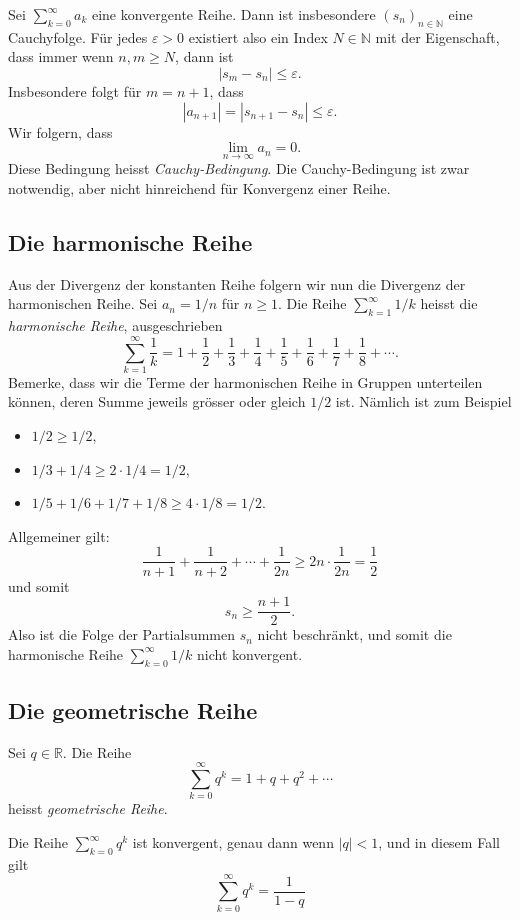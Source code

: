 \documentclass[../main.tex]{subfiles}
\begin{document}
\begin{remark}
  Sei $\sum_{k=0}^{\infty} a_k$ eine konvergente Reihe.
  Dann ist insbesondere ${(s_{n})}_{n \in \mathbb{N}}$ 
  eine Cauchyfolge.
  Für jedes $\varepsilon > 0$ existiert also ein Index
  $N \in \mathbb{N}$ mit der Eigenschaft, dass
  immer wenn $n, m \geq N$, dann ist
  \[
    |s_m - s_n| \leq \varepsilon.
  \]
  Insbesondere folgt für $m = n + 1$, dass
  \[
    |a_{n+1}| = |s_{n+1} - s_n| \leq \varepsilon.
  \]
  Wir folgern, dass
  \[
    \lim_{n \to \infty}a_n = 0.
  \]
  Diese Bedingung heisst  \emph{Cauchy-Bedingung}.
  Die Cauchy-Bedingung ist zwar notwendig, aber nicht
  hinreichend für Konvergenz einer Reihe.
\end{remark}

\subsection*{Die harmonische Reihe}
Aus der Divergenz der konstanten Reihe folgern wir
nun die Divergenz der harmonischen Reihe.
Sei $a_n = 1/n$ für $n \geq 1$. Die Reihe
$\sum_{k=1}^{\infty} 1/k$ heisst die
\emph{harmonische Reihe}, ausgeschrieben
\[
  \sum_{k=1}^{\infty} \frac{1}{k} = 
  1 + \frac{1}{2} + \frac{1}{3}
  + \frac{1}{4}
  + \frac{1}{5}
  + \frac{1}{6}
  + \frac{1}{7}
  + \frac{1}{8}
  + \cdots.
\]
Bemerke, dass wir die Terme der harmonischen Reihe
in Gruppen unterteilen können, deren Summe
jeweils grösser oder gleich $1/2$ ist. Nämlich ist
zum Beispiel
\begin{itemize}
  \item $1/2 \geq 1/2$,
  \item $1/3 + 1/4 \geq 2\cdot 1/4 = 1/2$,
  \item $1/5 + 1/6 + 1/7 + 1/8 \geq 4 \cdot 1/8 = 1/2$.
\end{itemize}
Allgemeiner gilt:
\[
  \frac{1}{n+1} + \frac{1}{n+2} + \cdots + \frac{1}{2n}
  \geq 2n \cdot \frac{1}{2n} = \frac{1}{2}
\]
und somit
\[
  s_n \geq \frac{n + 1}{2}.
\]
Also ist die Folge der Partialsummen $s_n$ nicht
beschränkt, und somit die 
harmonische Reihe 
$\sum_{k=0}^{\infty} 1/k$ nicht konvergent.

\subsection*{Die geometrische Reihe}
Sei $q \in \mathbb{R}$. Die Reihe
\[
  \sum_{k=0}^{\infty} q^k = 1 + q + q^2 + \cdots
\]
heisst \emph{geometrische Reihe}.


\begin{claim}
  Die Reihe
  $\sum_{k=0}^{\infty} q^k$ ist konvergent, genau dann
  wenn $|q| < 1$, und in diesem Fall gilt
  \[
    \sum_{k=0}^{\infty} q^k = \frac{1}{1-q}
  \]
\end{claim}
\end{document}
